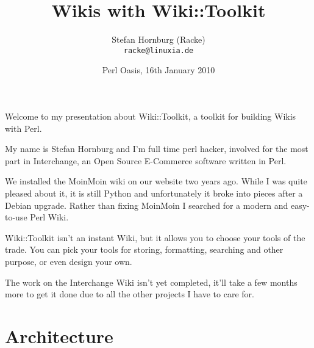 
\usepackage[T1]{fontenc}
\usepackage{mathptmx}
\usepackage[scaled=.90]{helvet}
\usepackage{courier}

\usepackage{beamerthemesplit}
\usepackage{verbatim}
\usepackage{hyperref}
\usepackage{listings}
\lstset{language=Perl,basicstyle=\footnotesize,tabsize=3}


\title{Wikis with Wiki::Toolkit}
\author[racke]{Stefan Hornburg (Racke)\\ \texttt{racke@linuxia.de}}
\date[OPW2010]{Perl Oasis, 16th January 2010}



\begin{frame}
  \titlepage
\end{frame}

\tableofcontents

Welcome to my presentation about Wiki::Toolkit, a toolkit for building
Wikis with Perl.

My name is Stefan Hornburg and I'm full time perl hacker, involved for
the most part in Interchange, an Open Source E-Commerce software 
written in Perl.

We installed the MoinMoin wiki on our website two years ago. While I was
quite pleased about it, it is still Python and unfortunately it broke 
into pieces after a Debian upgrade. Rather than fixing MoinMoin I searched
for a modern and easy-to-use Perl Wiki.

Wiki::Toolkit isn't an instant Wiki, but it allows you to choose
your tools of the trade. You can pick your tools for storing, formatting,
searching and other purpose, or even design your own.

The work on the Interchange Wiki isn't yet completed, it'll take a few
months more to get it done due to all the other projects I have to care
for.

\section{Architecture}

